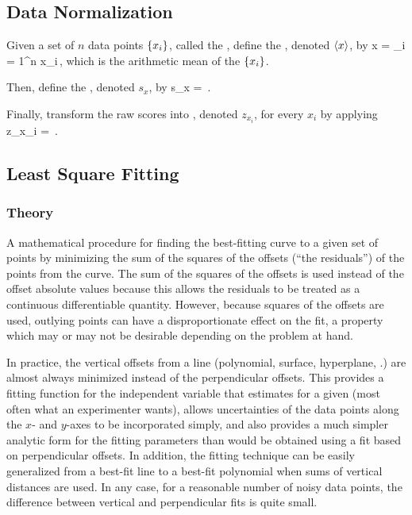 \subsection{Data Normalization}
Given a set of $n$ data points $\left\lbrace{x_i}\right\rbrace$, called the , define the , denoted $\left\langle{x}\right\rangle$, by
\beq
\avg x = \sum_{i = 1}^n x_i\,,
\eeq
which is the arithmetic mean of the $\left\lbrace{x_i}\right\rbrace$.

Then, define the , denoted $s_x$, by
\beq
s_x = \,.
\eeq

Finally, transform the raw scores into , denoted $z_{x_i}$, for every $x_i$ by applying
\beq
z_{x_i} = \,.
\eeq


\subsection{Least Square Fitting}

\subsubsection{Theory}
A mathematical procedure for finding the best-fitting curve to a given set of points by minimizing the sum of the squares of the offsets (``the residuals'') of the points from the curve. The sum of the squares of the offsets is used instead of the offset absolute values because this allows the residuals to be treated as a continuous differentiable quantity. However, because squares of the offsets are used, outlying points can have a disproportionate effect on the fit, a property which may or may not be desirable depending on the problem at hand.

In practice, the vertical offsets from a line (polynomial, surface, hyperplane, \etc.) are almost always minimized instead of the perpendicular offsets. This provides a fitting function for the independent variable  that estimates  for a given  (most often what an experimenter wants), allows uncertainties of the data points along the $x$- and $y$-axes to be incorporated simply, and also provides a much simpler analytic form for the fitting parameters than would be obtained using a fit based on perpendicular offsets. In addition, the fitting technique can be easily generalized from a best-fit line to a best-fit polynomial when sums of vertical distances are used. In any case, for a reasonable number of noisy data points, the difference between vertical and perpendicular fits is quite small.

